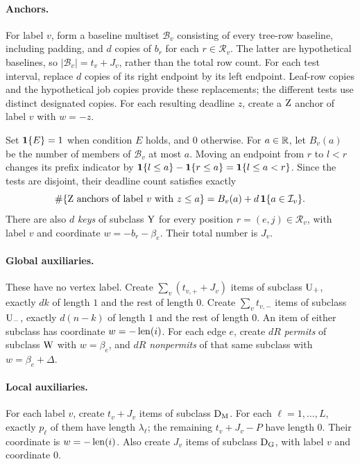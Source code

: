\paragraph{Anchors.}
For label $v$, form a baseline multiset $\mathcal B_v$ consisting of
every tree-row baseline, including padding, and $d$ copies of $b_r$
for each $r\in\mathcal R_v$. The latter are hypothetical baselines,
so $|\mathcal B_v|=t_v+J_v$, rather than the total row count.
For each test interval, replace $d$ copies of its right endpoint by
its left endpoint. Leaf-row copies and the hypothetical job copies
provide these replacements; the different tests use distinct designated
copies. For each resulting deadline $z$, create a $\mathrm{Z}$ anchor of
label $v$ with $w=-z$.

Set $\mathbf{1}\{E\}=1$ when condition $E$ holds, and $0$ otherwise.
For $a\in\mathbb R$, let $B_v(a)$ be the number of members of $\mathcal B_v$
at most $a$. Moving an endpoint from $r$ to $l<r$ changes its prefix
indicator by
$\mathbf{1}\{l\le a\}-\mathbf{1}\{r\le a\}=\mathbf{1}\{l\le a<r\}$.
Since the tests are disjoint, their deadline count satisfies exactly
\begin{equation}\label{eq:deadline-prefix}
 \#\{\mathrm{Z}\text{ anchors of label }v\text{ with }z\le a\}
 =B_v(a)+d\,\mathbf{1}\{a\in\mathcal I_v\}.
\end{equation}
There are also $d$ \emph{keys} of subclass $\mathrm{Y}$ for every position
$r=(e,j)\in\mathcal R_v$, with label $v$ and coordinate
$w=-b_r-\beta_e$. Their total number is $J_v$.

\paragraph{Global auxiliaries.}
These have no vertex label. Create
$\sum_v(t_{v,+}+J_v)$ items of subclass $\mathrm{U}_{+}$, exactly $dk$ of length
$1$ and the rest of length $0$. Create $\sum_v t_{v,-}$ items of
subclass $\mathrm{U}_{-}$, exactly $d(n-k)$ of length $1$ and the rest of length
$0$. An item of either subclass has coordinate $w=-\operatorname{len}(i)$.
For each edge $e$, create $dR$ \emph{permits} of subclass $\mathrm{W}$ with
$w=\beta_e$, and $dR$ \emph{nonpermits} of that same subclass with
$w=\beta_e+\Delta$.

\paragraph{Local auxiliaries.}
For each label $v$, create $t_v+J_v$ items of subclass $\mathrm{D}_{\mathrm M}$.
For each $\ell=1,\ldots,L$, exactly $p_\ell$ of them have length
$\lambda_\ell$; the remaining $t_v+J_v-P$ have length $0$.
Their coordinate is $w=-\operatorname{len}(i)$. Also create $J_v$ items of subclass
$\mathrm{D}_{\mathrm G}$, with label $v$ and coordinate $0$.

